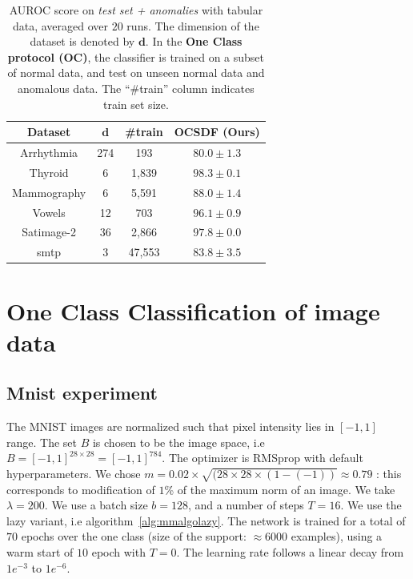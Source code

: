 \begin{table}%
    \centering
    \small
    \begin{tabular}{ccc|c}
    \hline
      Dataset & $\bm{d}$ &\#train & OCSDF (Ours) \\
    \hline
    \hline
    Arrhythmia & 274 & 193 & $80.0\pm 1.3$\\
    Thyroid & 6 & 1,839 & $98.3\pm 0.1$\\     
    Mammography & 6 & 5,591 & $88.0\pm 1.4$\\
    Vowels & 12 & 703 & $96.1\pm 0.9$\\
    Satimage-2 & 36 & 2,866 & $97.8\pm 0.0$\\
    smtp & 3 & 47,553 & $83.8\pm 3.5$\\
    \end{tabular}
    \caption{AUROC score on \textit{test set + anomalies} with tabular data, averaged over $20$ runs. The dimension of the dataset is denoted by $\bm{d}$. In the \textbf{One Class protocol (OC)}, the classifier is trained on a subset of normal data, and test on unseen normal data and anomalous data. The ``\#train'' column indicates train set size.}
    \label{tab:tabularrococ}
\end{table}

\section{One Class Classification of image data}\label{app:occimage}

\subsection{Mnist experiment}

The MNIST images are normalized such that pixel intensity lies in $[-1,1]$ range. The set $B$ is chosen to be the image space, i.e $B=[-1,1]^{28\times 28}=[-1,1]^{784}$. The optimizer is RMSprop with default hyperparameters. We chose $m=0.02\times \sqrt{(28\times 28\times (1-(-1))}\approx 0.79$ : this corresponds to modification of $1$\% of the maximum norm of an image. We take $\lambda=200$. We use a batch size $b=128$, and a number of steps $T=16$. We use the lazy variant, i.e algorithm~\ref{alg:mmalgolazy}. The network is trained for a total of $70$ epochs over the one class (size of the support: $\approx 6000$ examples), using a warm start of $10$ epoch with $T=0$. The learning rate follows a linear decay from $1e^{-3}$ to $1e^{-6}$. 

